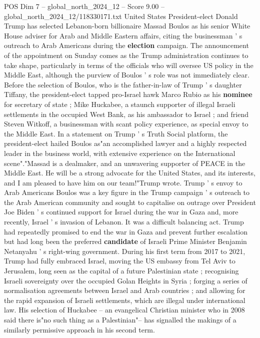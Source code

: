 \begin{textsample}{POS Dim 7 – global\_north\_2024\_12 – Score 9.00 – global\_north\_2024\_12/118330171.txt}  \label{ex:f7_pos_287}
United States President-elect Donald Trump has selected Lebanon-born billionaire Massad Boulos as his senior White House adviser for Arab and Middle Eastern affairs, citing the businessman ' s outreach to Arab Americans during the \textbf{election} campaign.
The announcement of the appointment on Sunday comes as the Trump administration continues to take shape, particularly in terms of the officials who will oversee US policy in the Middle East, although the purview of Boulos ' s role was not immediately clear.
Before the selection of Boulos, who is the father-in-law of Trump ' s daughter Tiffany, the president-elect tapped pro-Israel hawk Marco Rubio as his \textbf{nominee} for secretary of state ; Mike Huckabee, a staunch supporter of illegal Israeli settlements in the occupied West Bank, as his ambassador to Israel ; and friend Steven Witkoff, a businessman with scant policy experience, as special envoy to the Middle East.
In a statement on Trump ' s Truth Social platform, the president-elect hailed Boulos as"an accomplished lawyer and a highly respected leader in the business world, with extensive experience on the International scene"."Massad is a dealmaker, and an unwavering supporter of PEACE in the Middle East.
He will be a strong advocate for the United States, and its interests, and I am pleased to have him on our team!"Trump wrote.
Trump ' s envoy to Arab Americans Boulos was a key figure in the Trump campaign ' s outreach to the Arab American community and sought to capitalise on outrage over President Joe Biden ' s continued support for Israel during the war in Gaza and, more recently, Israel ' s invasion of Lebanon.
It was a difficult balancing act.
Trump had repeatedly promised to end the war in Gaza and prevent further escalation but had long been the preferred \textbf{candidate} of Israeli Prime Minister Benjamin Netanyahu ' s right-wing government.
During his first term from 2017 to 2021, Trump had fully embraced Israel, moving the US embassy from Tel Aviv to Jerusalem, long seen as the capital of a future Palestinian state ; recognising Israeli sovereignty over the occupied Golan Heights in Syria ; forging a series of normalisation agreements between Israel and Arab countries ; and allowing for the rapid expansion of Israeli settlements, which are illegal under international law.
His selection of Huckabee -- an evangelical Christian minister who in 2008 said there is"no such thing as a Palestinian"-- has signalled the makings of a similarly permissive approach in his second term.

\end{textsample}
